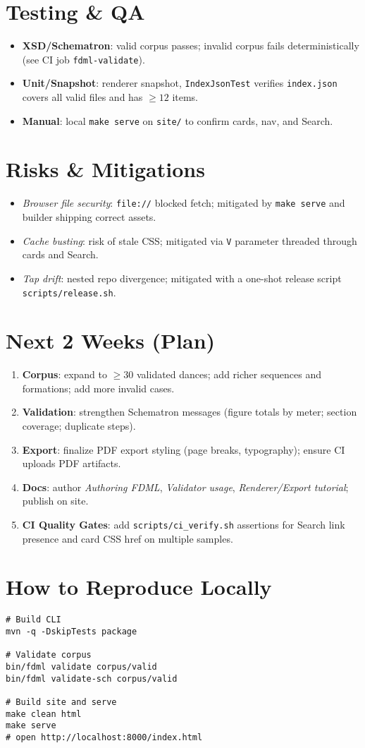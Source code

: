 \documentclass[11pt,a4paper]{article}
\newcommand{\code}[1]{\texttt{#1}}
\begin{document}
\section{Testing \& QA}
\begin{itemize}[leftmargin=1.2em]
  \item \textbf{XSD/Schematron}: valid corpus passes; invalid corpus fails deterministically (see CI job \code{fdml-validate}).
  \item \textbf{Unit/Snapshot}: renderer snapshot, \code{IndexJsonTest} verifies \code{index.json} covers all valid files and has $\ge 12$ items.
  \item \textbf{Manual}: local \code{make serve} on \code{site/} to confirm cards, nav, and Search.
\end{itemize}

\section{Risks \& Mitigations}
\begin{itemize}[leftmargin=1.2em]
  \item \textit{Browser file security}: \code{file://} blocked fetch; mitigated by \code{make serve} and builder shipping correct assets.
  \item \textit{Cache busting}: risk of stale CSS; mitigated via \code{V} parameter threaded through cards and Search.
  \item \textit{Tap drift}: nested repo divergence; mitigated with a one-shot release script \code{scripts/release.sh}.
\end{itemize}

\section{Next 2 Weeks (Plan)}
\begin{enumerate}[leftmargin=1.2em]
  \item \textbf{Corpus}: expand to $\ge 30$ validated dances; add richer sequences and formations; add more invalid cases.
  \item \textbf{Validation}: strengthen Schematron messages (figure totals by meter; section coverage; duplicate steps).
  \item \textbf{Export}: finalize PDF export styling (page breaks, typography); ensure CI uploads PDF artifacts.
  \item \textbf{Docs}: author \emph{Authoring FDML}, \emph{Validator usage}, \emph{Renderer/Export tutorial}; publish on site.
  \item \textbf{CI Quality Gates}: add \code{scripts/ci\_verify.sh} assertions for Search link presence and card CSS href on multiple samples.
\end{enumerate}

\section{How to Reproduce Locally}
\begin{verbatim}
# Build CLI
mvn -q -DskipTests package

# Validate corpus
bin/fdml validate corpus/valid
bin/fdml validate-sch corpus/valid

# Build site and serve
make clean html
make serve
# open http://localhost:8000/index.html
\end{verbatim}
\end{document}
